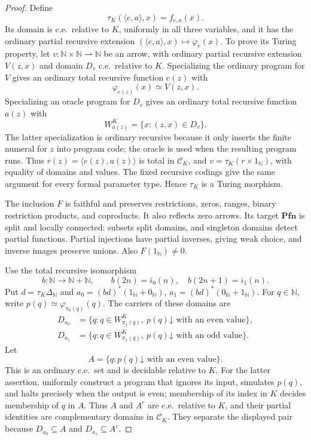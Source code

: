 \documentclass[11pt]{article}
\newcommand{\N}{\mathbb N}
\newcommand{\Pfn}{\mathbf{Pfn}}
\begin{document}
\begin{proof}
Define
\[
 \tau_K(\langle e,a\rangle,x)=f_{e,a}(x).
\]
Its domain is c.e.\ relative to $K$, uniformly in all three
variables, and it has the ordinary partial recursive extension
$(\langle e,a\rangle,x)\mapsto\varphi_e(x)$.
To prove its Turing property, let
$v:\N\times\N\rightharpoonup\N$ be an arrow, with ordinary
partial recursive extension $V(z,x)$ and domain $D_v$ c.e.\ relative
to $K$. Specializing the ordinary program for $V$ gives an ordinary
total recursive function $e(z)$ with
\[
 \varphi_{e(z)}(x)\simeq V(z,x).
\]
Specializing an oracle program for $D_v$ gives an ordinary total
recursive function $a(z)$ with
\[
 W_{a(z)}^K=\{x:(z,x)\in D_v\}.
\]
The latter specialization is ordinary recursive because it only
inserts the finite numeral for $z$ into program code; the oracle is
used when the resulting program runs. Thus
$r(z)=\langle e(z),a(z)\rangle$ is total in $\mathcal C_K$, and
$v=\tau_K(r\times1_{\N})$, with equality of domains and values.
The fixed recursive codings give the same argument for every formal
parameter type. Hence $\tau_K$ is a Turing morphism.

The inclusion $F$ is faithful and preserves restrictions, zeros,
ranges, binary restriction products, and coproducts. It also reflects
zero arrows. Its target $\Pfn$ is split and locally connected:
subsets split domains, and singleton domains detect partial functions.
Partial injections have partial inverses, giving weak choice, and
inverse images preserve unions. Also $F(1_{\N})\ne0$.

Use the total recursive isomorphism
\[
 b:\N\longrightarrow\N+\N,\qquad
 b(2n)=i_0(n),\quad b(2n+1)=i_1(n).
\]
Put $d=\tau_K\Delta_{\N}$ and
$a_0=(bd)^*(1_{\N}+0_{\N})$,
$a_1=(bd)^*(0_{\N}+1_{\N})$.
For $q\in\N$, write
$p(q)\simeq\varphi_{\pi_0(q)}(q)$. The carriers of these domains are
\[
 \begin{aligned}
 D_{a_0}&=\{q:q\in W_{\pi_1(q)}^K,
                    \ p(q)\mathord\downarrow\text{ with an even value}\},\\
 D_{a_1}&=\{q:q\in W_{\pi_1(q)}^K,
                    \ p(q)\mathord\downarrow\text{ with an odd value}\}.
 \end{aligned}
\]
Let
\[
 A=\{q:p(q)\mathord\downarrow\text{ with an even value}\}.
\]
This is an ordinary c.e.\ set and is decidable relative to $K$.
For the latter assertion, uniformly construct a program that ignores
its input, simulates $p(q)$, and halts precisely when the output is
even; membership of its index in $K$ decides membership of $q$ in $A$.
Thus $A$ and $A^c$ are c.e.\ relative to $K$, and their partial
identities are complementary domains in $\mathcal C_K$.
They separate the displayed pair because
$D_{a_0}\subseteq A$ and $D_{a_1}\subseteq A^c$.


\end{proof}
\end{document}
